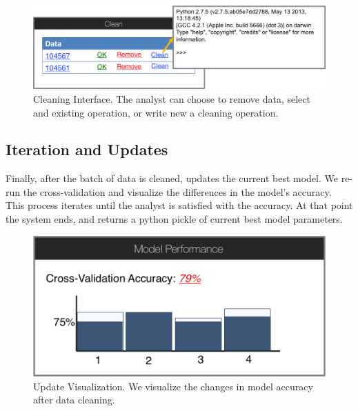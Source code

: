 \begin{figure}[t]
\centering
 \includegraphics[width=\columnwidth]{figs/interface4.png}
 \caption{Cleaning Interface. The analyst can choose to remove data, select and existing operation, or write new a cleaning operation.}
\end{figure}

\subsection{Iteration and Updates}
Finally, after the batch of data is cleaned, \sys updates the current best model.
We re-run the cross-validation and visualize the differences in the model's accuracy.
This process iterates until the analyst is satisfied with the accuracy.
At that point the system ends, and returns a python pickle of current best model parameters.

\begin{figure}[t]
\centering
 \includegraphics[width=0.6\columnwidth]{figs/interface5.png}
 \caption{Update Visualization. We visualize the changes in model accuracy after data cleaning.}
\end{figure}
